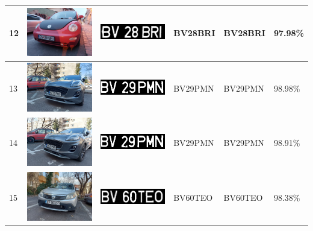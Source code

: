 \documentclass[a4paper,12pt]{report}
\begin{document}
\begin{longtable}{| m{0.6cm} | m{3cm} | m{3cm} | m{1.8cm} | m{1.8cm} | m{1.8cm} |}
    12  & \includegraphics[width=3cm,keepaspectratio]{dataset/5_d1.jpg}   & \includegraphics[width=3cm,keepaspectratio]{segmentari/12.jpg}  & BV28BRI             & BV28BRI              & 97.98\%    \\ \hline
    13  & \includegraphics[width=3cm,keepaspectratio]{dataset/6_d1.jpg}   & \includegraphics[width=3cm,keepaspectratio]{segmentari/13.jpg}  & BV29PMN             & BV29PMN              & 98.98\%    \\ \hline
    14  & \includegraphics[width=3cm,keepaspectratio]{dataset/6_d2.jpg}   & \includegraphics[width=3cm,keepaspectratio]{segmentari/14.jpg}  & BV29PMN             & BV29PMN              & 98.91\%    \\ \hline
    15  & \includegraphics[width=3cm,keepaspectratio]{dataset/7_d1.jpg}   & \includegraphics[width=3cm,keepaspectratio]{segmentari/15.jpg}  & BV60TEO             & BV60TEO              & 98.38\%    \\ \hline

\end{longtable}
\end{document}

